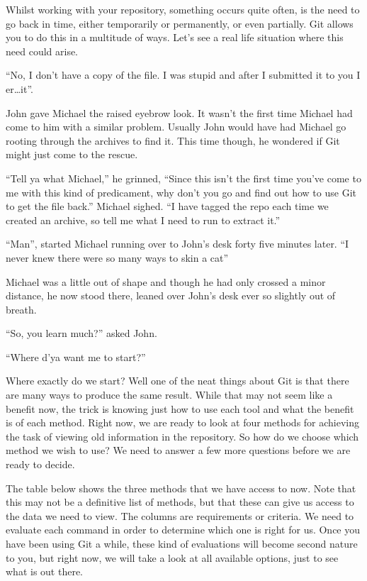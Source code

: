 Whilst working with your repository, something occurs quite often, is the need to go back in time, either temporarily or permanently, or even partially.  Git allows you to do this in a multitude of ways.  Let's see a real life situation where this need could arise.

\begin{trenches}
``No, I don't have a copy of the file.  I was stupid and after I submitted it to you I er\ldots\deleted it''.  

John gave Michael the raised eyebrow look.  It wasn't the first time Michael had come to him with a similar problem.  Usually John would have had Michael go rooting through the archives to find it.  This time though, he wondered if Git might just come to the rescue.

``Tell ya what Michael,'' he grinned, ``Since this isn't the first time you've come to me with this kind of predicament, why don't you go and find out how to use Git to get the file back.''  Michael sighed.  ``I have tagged the repo each time we created an archive, so tell me what I need to run to extract it.''

\thoughtbreak

``Man'', started Michael running over to John's desk forty five minutes later.  ``I never knew there were so many ways to skin a cat''

Michael was a little out of shape and though he had only crossed a minor distance, he now stood there, leaned over John's desk ever so slightly out of breath.

``So, you learn much?'' asked John.

``Where d'ya want me to start?''

\end{trenches}

Where exactly do we start?  Well one of the neat things about Git is that there are many ways to produce the same result.  While that may not seem like a benefit now, the trick is knowing just how to use each tool and what the benefit is of each method.  Right now, we are ready to look at four methods for achieving the task of viewing old information in the repository.  So how do we choose which method we wish to use?  We need to answer a few more questions before we are ready to decide.

The table below shows the three methods that we have access to now.  Note that this may not be a definitive list of methods, but that these can give us access to the data we need to view.  The columns are requirements or criteria.  We need to evaluate each command in order to determine which one is right for us.  Once you have been using Git a while, these kind of evaluations will become second nature to you, but right now, we will take a look at all available options, just to see what is out there.

